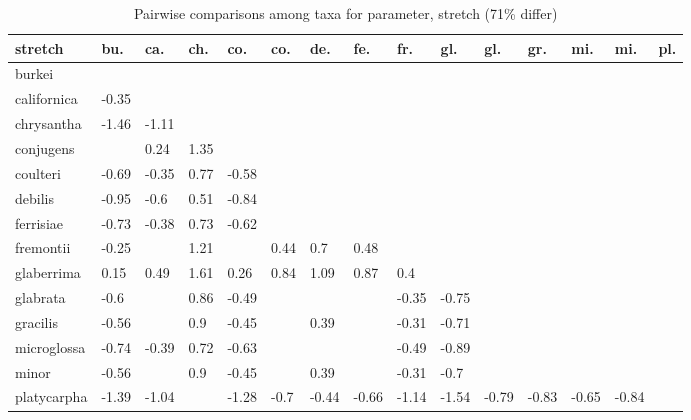 \begin{table}[ht]
\centering
\caption{Pairwise comparisons among taxa for parameter, stretch (71\% differ)} 
\begin{tabular}{lllllllllllllll}
  \hline
stretch & bu. & ca. & ch. & co. & co. & de. & fe. & fr. & gl. & gl. & gr. & mi. & mi. & pl. \\ 
  \hline
burkei &  &  &  &  &  &  &  &  &  &  &  &  &  &  \\ 
  californica & -0.35 &  &  &  &  &  &  &  &  &  &  &  &  &  \\ 
  chrysantha & -1.46 & -1.11 &  &  &  &  &  &  &  &  &  &  &  &  \\ 
  conjugens &  & 0.24 & 1.35 &  &  &  &  &  &  &  &  &  &  &  \\ 
  coulteri & -0.69 & -0.35 & 0.77 & -0.58 &  &  &  &  &  &  &  &  &  &  \\ 
  debilis & -0.95 & -0.6 & 0.51 & -0.84 &  &  &  &  &  &  &  &  &  &  \\ 
  ferrisiae & -0.73 & -0.38 & 0.73 & -0.62 &  &  &  &  &  &  &  &  &  &  \\ 
  fremontii & -0.25 &  & 1.21 &  & 0.44 & 0.7 & 0.48 &  &  &  &  &  &  &  \\ 
  glaberrima & 0.15 & 0.49 & 1.61 & 0.26 & 0.84 & 1.09 & 0.87 & 0.4 &  &  &  &  &  &  \\ 
  glabrata & -0.6 &  & 0.86 & -0.49 &  &  &  & -0.35 & -0.75 &  &  &  &  &  \\ 
  gracilis & -0.56 &  & 0.9 & -0.45 &  & 0.39 &  & -0.31 & -0.71 &  &  &  &  &  \\ 
  microglossa & -0.74 & -0.39 & 0.72 & -0.63 &  &  &  & -0.49 & -0.89 &  &  &  &  &  \\ 
  minor & -0.56 &  & 0.9 & -0.45 &  & 0.39 &  & -0.31 & -0.7 &  &  &  &  &  \\ 
  platycarpha & -1.39 & -1.04 &  & -1.28 & -0.7 & -0.44 & -0.66 & -1.14 & -1.54 & -0.79 & -0.83 & -0.65 & -0.84 &  \\ 
   \hline
\end{tabular}
\end{table}
